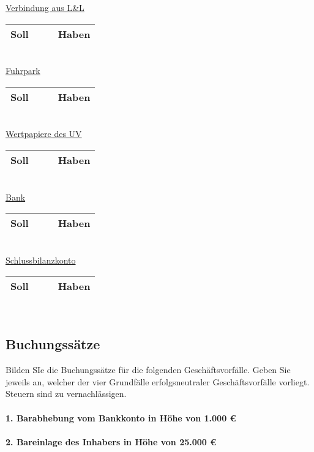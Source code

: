 \documentclass[paper=a4, fontsize=11pt]{scrartcl}
\numberwithin{equation}{section}
\numberwithin{figure}{section}
\numberwithin{table}{section}
\begin{document}
\underline{Verbindung aus L&L}

\begin{tabular}{cc|cc}
\hline
Soll & & & Haben \\
\hline
\end{tabular}
\\

\underline{Fuhrpark}

\begin{tabular}{cc|cc}
\hline
Soll & & & Haben \\
\hline
\end{tabular}
\\

\underline{Wertpapiere des UV}

\begin{tabular}{cc|cc}
\hline
Soll & & & Haben \\
\hline
\end{tabular}
\\

\underline{Bank}

\begin{tabular}{cc|cc}
\hline
Soll & & & Haben \\
\hline
\end{tabular}
\\

\underline{Schlussbilanzkonto}

\begin{tabular}{cc|cc}
\hline
Soll & & & Haben \\
\hline
\end{tabular}
\\


\subsection{Buchungssätze}

Bilden SIe die Buchungssätze für die folgenden Geschäftsvorfälle. Geben Sie jeweils an, welcher der vier Grundfälle erfolgsneutraler Geschäftsvorfälle vorliegt. Steuern sind zu vernachlässigen.

\paragraph{1. Barabhebung vom Bankkonto in Höhe von 1.000 €}

\paragraph{2. Bareinlage des Inhabers in Höhe von 25.000 €}
\end{document}
